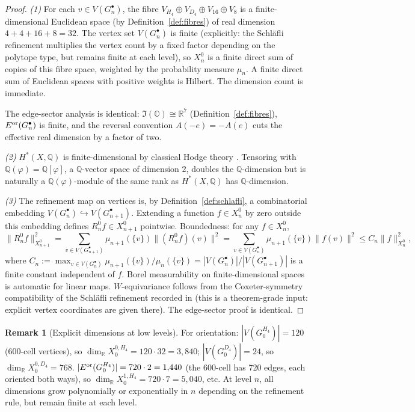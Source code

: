 \documentclass[11pt, a4paper]{amsart}
\theoremstyle{definition}
\newtheorem{remark}[theorem]{Remark}
\newcommand{\R}{\mathbb{R}}
\newcommand{\Q}{\mathbb{Q}}
\newcommand{\OO}{\mathbb{O}}
\newcommand{\pphi}{\varphi}
\begin{document}
\begin{proof}
\emph{(1)} For each $v \in V(G_n^\bullet)$, the fibre
$V_{H_4} \oplus V_{D_4} \oplus V_{16} \oplus V_8$ is a
finite-dimensional Euclidean space (by Definition~\ref{def:fibres})
of real dimension $4 + 4 + 16 + 8 = 32$. The vertex set
$V(G_n^\bullet)$ is finite (explicitly: the Schl\"afli refinement
multiplies the vertex count by a fixed factor depending on the
polytope type, but remains finite at each level), so $X_n^0$ is a
finite direct sum of copies of this fibre space, weighted by the
probability measure $\mu_n$. A finite direct sum of Euclidean
spaces with positive weights is Hilbert. The dimension count is
immediate.

The edge-sector analysis is identical: $\Im(\OO) \cong \R^7$
(Definition~\ref{def:fibres}), $E^{\rm or}(G_n^\bullet)$ is finite,
and the reversal convention
$A(-e) = -A(e)$ cuts the effective real dimension by a factor
of two.

\emph{(2)} $H^*(X, \Q)$ is finite-dimensional by classical Hodge
theory \cite{GriffithsHarris}. Tensoring with $\Q(\pphi) = \Q[\pphi]$,
a $\Q$-vector space of dimension $2$, doubles the $\Q$-dimension
but is naturally a $\Q(\pphi)$-module of the same rank as
$H^*(X, \Q)$ has $\Q$-dimension.

\emph{(3)} The refinement map on vertices is, by
Definition~\ref{def:schlafli}, a combinatorial embedding
$V(G_n^\bullet) \hookrightarrow V(G_{n+1}^\bullet)$. Extending a
function $f \in X_n^0$ by zero outside this embedding defines
$R_n^0 f \in X_{n+1}^0$ pointwise. Boundedness: for any $f \in X_n^0$,
\[
  \|R_n^0 f\|_{X_{n+1}^0}^2
  = \sum_{v \in V(G_{n+1}^\bullet)} \mu_{n+1}(\{v\})
    \|(R_n^0 f)(v)\|^2
  = \sum_{v \in V(G_n^\bullet)} \mu_{n+1}(\{v\}) \|f(v)\|^2
  \leq C_n \|f\|_{X_n^0}^2,
\]
where $C_n := \max_{v \in V(G_n^\bullet)}
\mu_{n+1}(\{v\})/\mu_n(\{v\}) =
|V(G_n^\bullet)|/|V(G_{n+1}^\bullet)|$ is a finite constant
independent of $f$. Borel measurability on finite-dimensional spaces
is automatic for linear maps. $W$-equivariance follows from the
Coxeter-symmetry compatibility of the Schl\"afli refinement
recorded in \cite[\S 12.2]{CascadeEmbeddings} (this is a
theorem-grade input: explicit vertex coordinates are given there).
The edge-sector proof is identical.
\end{proof}

\begin{remark}[Explicit dimensions at low levels]
\label{rmk:low-dims}
For orientation: $|V(G_0^{H_4})| = 120$ (600-cell vertices), so
$\dim_\R X_0^{0,H_4} = 120 \cdot 32 = 3{,}840$; $|V(G_0^{D_4})| =
24$, so $\dim_\R X_0^{0,D_4} = 768$.
$|E^{\rm or}(G_0^{H_4})| = 720 \cdot 2 = 1{,}440$ (the 600-cell has
720 edges, each oriented both ways), so
$\dim_\R X_0^{1,H_4} = 720 \cdot 7 = 5{,}040$, etc.
At level $n$, all dimensions grow polynomially or exponentially in
$n$ depending on the refinement rule, but remain finite at each
level.
\end{remark}
\end{document}

